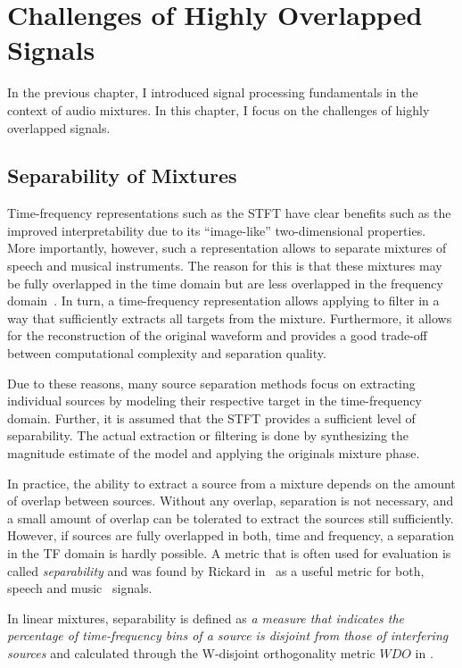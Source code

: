 \hypertarget{highly-overlapped-signals}{%
\chapter{Challenges of Highly Overlapped Signals}\label{cha:highly-overlapped-signals}}

In the previous chapter, I introduced signal processing fundamentals in the context of audio mixtures. In this chapter, I focus on the challenges of highly overlapped signals.

\hypertarget{separability-of-mixtures}{%
\section{Separability of Mixtures}\label{separability-of-mixtures}}

Time-frequency representations such as the \ac{STFT} have clear benefits such as the improved interpretability due to its ``image-like'' two-dimensional properties.
More importantly, however, such a representation allows to separate mixtures of speech and musical instruments.
The reason for this is that these mixtures may be fully overlapped in the time domain but are less overlapped in the frequency domain~\cite{rickard02, giannoulis11, rafii}.
In turn, a time-frequency representation allows applying to filter in a way that sufficiently extracts all targets from the mixture.
Furthermore, it allows for the reconstruction of the original waveform and provides a good trade-off between computational complexity and separation quality.
\par
Due to these reasons, many source separation methods focus on extracting individual sources by modeling their respective target in the time-frequency domain.
Further, it is assumed that the \acs{STFT} provides a sufficient level of separability.
The actual extraction or filtering is done by synthesizing the magnitude estimate of the model and applying the originals mixture phase.
\par
In practice, the ability to extract a source from a mixture depends on the amount of overlap between sources.
Without any overlap, separation is not necessary, and a small amount of overlap can be tolerated to extract the sources still sufficiently.
However, if sources are fully overlapped in both, time and frequency, a separation in the TF domain is hardly possible.
A metric that is often used for evaluation is called \emph{separability} and was found by Rickard in~\cite{rickard02} as a useful metric for both, speech and music~\cite{giannoulis11} signals.
\par
In linear mixtures, separability is defined as \emph{a measure that indicates the percentage of time-frequency bins of a source is disjoint from those of interfering sources} and calculated through the W-disjoint orthogonality metric \(WDO\) in \cite{rickard02}.

